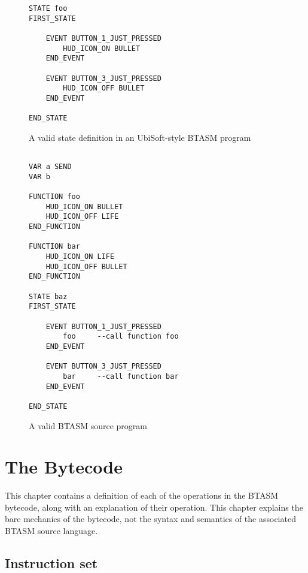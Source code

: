 \documentclass[12pt,a4paper]{scrbook}
\begin{document}
\begin{figure}[h]
\begin{lstlisting}
STATE foo
FIRST_STATE

	EVENT BUTTON_1_JUST_PRESSED
		HUD_ICON_ON BULLET
	END_EVENT

	EVENT BUTTON_3_JUST_PRESSED
		HUD_ICON_OFF BULLET
	END_EVENT

END_STATE
\end{lstlisting}
\caption{A valid state definition in an UbiSoft-style BTASM program} 
\end{figure}

\begin{figure}[h]
\begin{lstlisting}

VAR a SEND
VAR b 

FUNCTION foo
	HUD_ICON_ON BULLET
	HUD_ICON_OFF LIFE
END_FUNCTION

FUNCTION bar
	HUD_ICON_ON LIFE
	HUD_ICON_OFF BULLET
END_FUNCTION
	
STATE baz
FIRST_STATE

	EVENT BUTTON_1_JUST_PRESSED
		foo		--call function foo
	END_EVENT

	EVENT BUTTON_3_JUST_PRESSED
		bar		--call function bar
	END_EVENT

END_STATE
\end{lstlisting}
\caption{A valid BTASM source program} 
\end{figure}

\chapter{The Bytecode}
This chapter contains a definition of each of the operations in the BTASM bytecode, along with an
explanation of their operation.  This chapter explains the bare mechanics of the bytecode, not
the syntax and semantics of the associated BTASM source language.  

\section{Instruction set}
\end{document}
